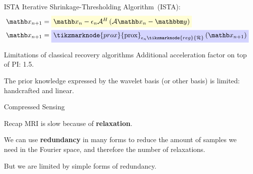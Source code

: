 \begin{frame}{ISTA}
     Iterative Shrinkage-Thresholding Algorithm~(ISTA):
     \begin{equation*}
        \label{eq:ista-step}
        \begin{split}
            \xb_{n+1} &= \highlight{yellow}{$\xb_n - \epsilon_n \mathcal{A}^H\left(\mathcal{A} \xb_n - \ybb\right)$}\\
            \xb_{n+1} &= \highlight{blue}{$\tikzmarknode{prox}{\operatorname{prox}}_{\epsilon_n \tikzmarknode{reg}{\mathcal{R}}}\left(\xb_{n+1}\right)$}
        \end{split}
    \end{equation*}
\end{frame}




\begin{frame}{Limitations of classical recovery algorithms}
    Additional acceleration factor on top of PI: 1.5. %
    
    \pause
    The prior knowledge expressed by the wavelet basis (or other basis) is limited: handcrafted and linear.
\end{frame}

\begin{frame}{Compressed Sensing}
    \begin{block}{Recap}
        MRI is slow because of \textbf{relaxation}. 
        
        \pause
        We can use \textbf{redundancy} in many forms to reduce the amount of samples we need in the Fourier space, and therefore the number of relaxations.
        
        \pause
        But we are limited by simple forms of redundancy.
    \end{block}
\end{frame}